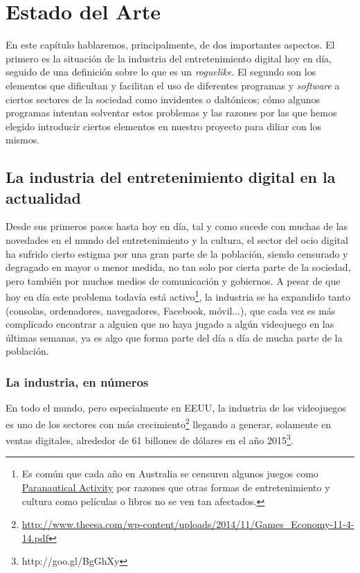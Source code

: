 \chapter{Estado del Arte}

En este capítulo hablaremos, principalmente, de dos importantes aspectos. El primero es la situación de la industria del entretenimiento digital hoy en día, seguido de una definición sobre lo que es un \textit{roguelike}. El segundo son los elementos que dificultan y facilitan el uso de diferentes programas y \textit{software} a ciertos sectores de la sociedad como invidentes o daltónicos; cómo algunos programas intentan solventar estos problemas y las razones por las que hemos elegido introducir ciertos elementos en nuestro proyecto para diliar con los mismos.

\section{La industria del entretenimiento digital en la actualidad}

Desde sus primeros pasos hasta hoy en día, tal y como sucede con muchas de las novedades en el mundo del entretenimiento y la cultura, el sector del ocio digital ha sufrido cierto estigma por una gran parte de la población, siendo censurado y degragado en mayor o menor medida, no tan solo por cierta parte de la sociedad, pero también por muchos medios de comunicación y gobiernos. A pesar de que hoy en día este problema todavía está activo\footnote{Es común que cada año en Australia se censuren algunos juegos como \href{http://goo.gl/hFrQah}{Paranautical Activity} por razones que otras formas de entretenimiento y cultura como películas o libros no se ven tan afectados.}, la industria se ha expandido tanto (consolas, ordenadores, navegadores, Facebook, móvil...), que cada vez es más complicado encontrar a alguien que no haya jugado a algún videojuego en las últimas semanas, ya es algo que forma parte del día a día de mucha parte de la población.

\subsection{La industria, en números}
En todo el mundo, pero especialmente en EEUU, la industria de los videojuegos es uno de los sectores con más crecimiento\footnote{\url{http://www.theesa.com/wp-content/uploads/2014/11/Games_Economy-11-4-14.pdf}} llegando a generar, solamente en ventas digitales, alrededor de 61 billones de dólares en el año 2015\footnote{http://goo.gl/BgGhXy}.

